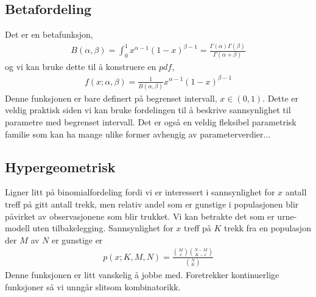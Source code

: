 \subsection{Betafordeling}
Det er en betafunksjon,
\begin{align}
B(\alpha,\beta)=\int_0^1x^{\alpha-1}(1-x)^{\beta-1} = \frac{\Gamma(\alpha)\Gamma(\beta)}{\Gamma(\alpha+\beta)}
\end{align}
og vi kan bruke dette til å konstruere en $pdf$,
\begin{align}
f(x;\alpha,\beta) = \frac{1}{B(\alpha,\beta)}x^{\alpha-1}(1-x)^{\beta-1}
\end{align}
Denne funksjonen er bare definert på begrenset intervall, $x\in (0,1)$. Dette er veldig praktisk siden vi kan bruke fordelingen til å beskrive sannsynlighet til parametre med begrenset intervall. Det er også en veldig fleksibel parametrisk familie som kan ha mange ulike former avhengig av parameterverdier...
\subsection{Hypergeometrisk}
Ligner litt på binomialfordeling fordi vi er interessert i sannsynlighet for $x$ antall treff på gitt antall trekk, men relativ andel som er gunstige i populasjonen blir påvirket av observasjonene som blir trukket. Vi kan betrakte det som er urne-modell uten tilbakelegging. Sannsynlighet for $x$ treff på $K$ trekk fra en populasjon der $M$ av $N$ er gunstige er
\begin{align}
p(x;K,M,N) = \frac{\binom{M}{x}\binom{N-M}{K-x}}{\binom{N}{K}}
\end{align}
Denne funksjonen er litt vanskelig å jobbe med. Foretrekker kontinuerlige funksjoner så vi unngår slitsom kombinatorikk.